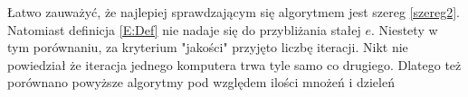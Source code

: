 \documentclass{article}
\begin{document}
Łatwo zauważyć, że najlepiej sprawdzającym się algorytmem jest szereg \ref{szereg2}. Natomiast definicja \ref{E:Def} nie nadaje się do przybliżania stałej $e$. Niestety w tym porównaniu, za kryterium "jakości" przyjęto liczbę iteracji. Nikt nie powiedział że iteracja jednego komputera trwa tyle samo co drugiego. Dlatego też porównano powyższe algorytmy pod względem ilości mnożeń i dzieleń
\\\\\\\\\\\\\\\\\\\\\\\\\\\\\\
\end{document}
